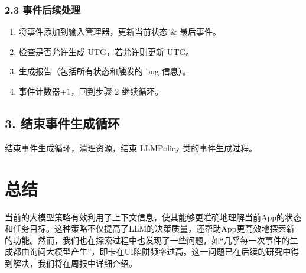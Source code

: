 \documentclass[UTF8, fontset=windows]{article}
\begin{document}
\subsubsection*{2.3 事件后续处理}
\begin{enumerate}[leftmargin=2em]
    \item 将事件添加到输入管理器，更新当前状态 \& 最后事件。
    \item 检查是否允许生成 UTG，若允许则更新 UTG。
    \item 生成报告（包括所有状态和触发的 bug 信息）。
    \item 事件计数器$+1$，回到步骤 2 继续循环。
\end{enumerate}

\subsection*{3. 结束事件生成循环}
结束事件生成循环，清理资源，结束 LLMPolicy 类的事件生成过程。

\section*{总结}

当前的大模型策略有效利用了上下文信息，使其能够更准确地理解当前App的状态和任务目标。这种策略不仅提高了LLM的决策质量，还帮助App更高效地探索新的功能。然而，我们也在探索过程中也发现了一些问题，如“几乎每一次事件的生成都由询问大模型产生”，即卡在UI陷阱频率过高。这一问题已在后续的研究中得到解决，我们将在周报中详细介绍。
\end{document}
